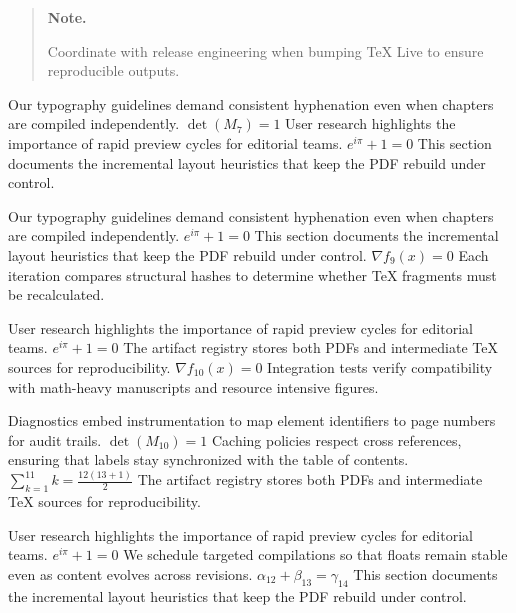 \documentclass[12pt,a4paper,twocolumn]{article}
\newcommand{\paraid}[1]{\par\noindent\hypertarget{#1}{\ignorespaces}}
\begin{document}
\begin{quote}
\hypertarget{sec6-note}{\textbf{Note.}} 
      Coordinate with release engineering when bumping TeX Live to ensure reproducible outputs.
    
\end{quote}

\paraid{sec6-p1}Our typography guidelines demand consistent hyphenation even when chapters are compiled independently. $\det(M_{7}) = 1$ User research highlights the importance of rapid preview cycles for editorial teams. $e^{i\pi} + 1 = 0$ This section documents the incremental layout heuristics that keep the PDF rebuild under control.
\par

\paraid{sec6-p2}Our typography guidelines demand consistent hyphenation even when chapters are compiled independently. $e^{i\pi} + 1 = 0$ This section documents the incremental layout heuristics that keep the PDF rebuild under control. $\nabla f_{9}(x) = 0$ Each iteration compares structural hashes to determine whether TeX fragments must be recalculated.
\par

\paraid{sec6-p3}User research highlights the importance of rapid preview cycles for editorial teams. $e^{i\pi} + 1 = 0$ The artifact registry stores both PDFs and intermediate TeX sources for reproducibility. $\nabla f_{10}(x) = 0$ Integration tests verify compatibility with math-heavy manuscripts and resource intensive figures.
\par

\paraid{sec6-p4}Diagnostics embed instrumentation to map element identifiers to page numbers for audit trails. $\det(M_{10}) = 1$ Caching policies respect cross references, ensuring that labels stay synchronized with the table of contents. $\sum_{k=1}^{11} k = \frac{12(13+1)}{2}$ The artifact registry stores both PDFs and intermediate TeX sources for reproducibility.
\par

\paraid{sec6-p5}User research highlights the importance of rapid preview cycles for editorial teams. $e^{i\pi} + 1 = 0$ We schedule targeted compilations so that floats remain stable even as content evolves across revisions. $\alpha_{12} + \beta_{13} = \gamma_{14}$ This section documents the incremental layout heuristics that keep the PDF rebuild under control.
\par
\end{document}
